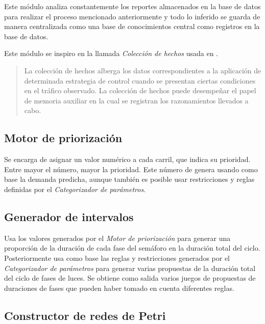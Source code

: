 Este módulo analiza constantemente los reportes almacenados en la base
de datos para realizar el proceso mencionado anteriormente y todo lo
inferido se guarda de manera centralizada como una base de conocimientos
central como registros en la base de datos.

Este módulo se inspiro en la llamada \emph{Colección de hechos} usada en
\textcite{JoelTrejo2006}.

\begin{quote}
La colección de hechos alberga los datos correspondientes a la
aplicación de determinada estrategia de control cuando se presentan
ciertas condiciones en el tráfico observado. La colección de hechos
puede desempeñar el papel de memoria auxiliar en la cual se registran
los razonamientos llevados a cabo. \textcite[p. 47]{JoelTrejo2006}
\end{quote}

\hypertarget{motor-de-priorizaciuxf3n}{%
\subsection{Motor de priorización}\label{motor-de-priorizaciuxf3n}}

Se encarga de asignar un valor numérico a cada carril, que indica su
prioridad. Entre mayor el número, mayor la prioridad. Este número de
genera usando como base la demanda predicha, aunque también es posible
usar restricciones y reglas definidas por el \emph{Categorizador de
parámetros}.

\hypertarget{generador-de-intervalos}{%
\subsection{Generador de intervalos}\label{generador-de-intervalos}}

Usa los valores generados por el \emph{Motor de priorización} para
generar una proporción de la duración de cada fase del semáforo en la
duración total del ciclo. Posteriormente usa como base las reglas y
restricciones generados por el \emph{Categorizador de parámetros} para
generar varias propuestas de la duración total del ciclo de fases de
luces. Se obtiene como salida varios juegos de propuestas de duraciones
de fases que pueden haber tomado en cuenta diferentes reglas.

\hypertarget{constructor-de-redes-de-petri}{%
\subsection{Constructor de redes de
Petri}\label{constructor-de-redes-de-petri}}


